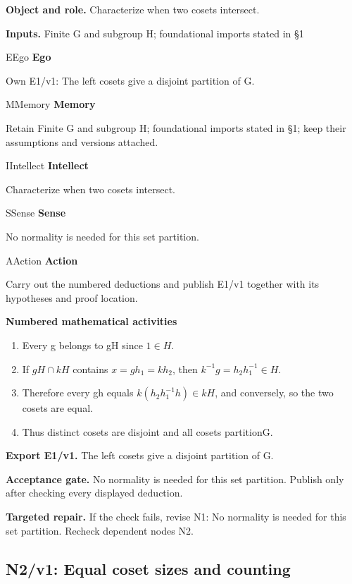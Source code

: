 \documentclass[preprint,12pt,aps,pra,showkeys,amsmath,amssymb,superscriptaddress,floatfix]{revtex4-2}
\theoremstyle{definition}
\theoremstyle{remark}
\newcommand{\mmfaculty}[3]{%
 \begin{mmfacultybox}{#1}{#2}
 {\sffamily\bfseries\color{MMBlue}#2}\par\smallskip #3
 \end{mmfacultybox}}
\newcommand{\field}[2]{\par\smallskip\noindent\textbf{#1.} #2\par}
\begin{document}
\field{Object and role}{Characterize when two cosets intersect.}

\field{Inputs}{Finite G and subgroup H; foundational imports stated in §1}

\mmfaculty{E}{Ego}{Own E1/v1: The left cosets give a disjoint partition of G.}

\mmfaculty{M}{Memory}{Retain Finite G and subgroup H; foundational imports stated in §1; keep
their assumptions and versions attached.}

\mmfaculty{I}{Intellect}{Characterize when two cosets intersect.}

\mmfaculty{S}{Sense}{No normality is needed for this set partition.}

\mmfaculty{A}{Action}{Carry out the numbered deductions and publish E1/v1 together with its
hypotheses and proof location.}

\smallskip\noindent\textbf{Numbered mathematical activities}

\begin{enumerate}[label=N1.\arabic*,leftmargin=3.4em]

\item Every g belongs to gH since \(1\in H\).

\item If \(gH\cap kH\) contains \(x=gh_{1}=kh_{2}\), then
\(k^{-1}g=h_{2}h_{1}^{-1}\in H\).

\item Therefore every gh equals \(k(h_{2}h_{1}^{-1}h)\in kH\), and conversely,
so the two cosets are equal.

\item Thus distinct cosets are disjoint and all cosets partitionG.

\end{enumerate}

\field{Export E1/v1}{The left cosets give a disjoint partition of G.}

\field{Acceptance gate}{No normality is needed for this set partition. Publish only after
checking every displayed deduction.}

\field{Targeted repair}{If the check fails, revise N1: No normality is needed for this set
partition. Recheck dependent nodes N2.}

\clearpage

\subsection{N2/v1: Equal coset sizes and counting}
\end{document}
